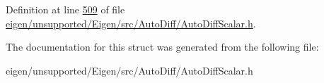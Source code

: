 Definition at line \hyperlink{eigen_2unsupported_2_eigen_2src_2_auto_diff_2_auto_diff_scalar_8h_source_l00509}{509} of file \hyperlink{eigen_2unsupported_2_eigen_2src_2_auto_diff_2_auto_diff_scalar_8h_source}{eigen/unsupported/\+Eigen/src/\+Auto\+Diff/\+Auto\+Diff\+Scalar.\+h}.



The documentation for this struct was generated from the following file\+:\begin{DoxyCompactItemize}
\item 
eigen/unsupported/\+Eigen/src/\+Auto\+Diff/\+Auto\+Diff\+Scalar.\+h\end{DoxyCompactItemize}
